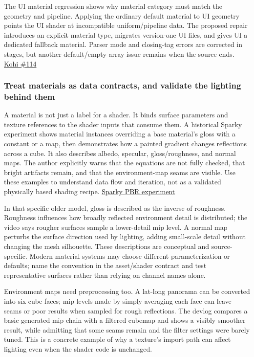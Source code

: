 The UI material regression shows why material category must match the geometry and pipeline. Applying the ordinary default material to UI geometry points the UI shader at incompatible uniform/pipeline data. The proposed repair introduces an explicit material type, migrates version-one UI files, and gives UI a dedicated fallback material. Parser mode and closing-tag errors are corrected in stages, but another default/empty-array issue remains when the source ends. \href{https://www.youtube.com/watch?v=K-EFytY5Pmg}{Kohi \#114}

\subsubsection{Treat materials as data contracts, and validate the lighting behind them}\label{06-engine-ii-ch025-treat-materials-as-data-contracts-and-validate-the-lighting-behind-them}

A material is not just a label for a shader. It binds surface parameters and texture references to the shader inputs that consume them. A historical Sparky experiment shows material instances overriding a base material's gloss with a constant or a map, then demonstrates how a painted gradient changes reflections across a cube. It also describes albedo, specular, gloss/roughness, and normal maps. The author explicitly warns that the equations are not fully checked, that bright artifacts remain, and that the environment-map seams are visible. Use these examples to understand data flow and iteration, not as a validated physically based shading recipe. \href{https://www.youtube.com/watch?v=zqmgcQd6ayc&t=17m30s}{Sparky PBR experiment}

In that specific older model, gloss is described as the inverse of roughness. Roughness influences how broadly reflected environment detail is distributed; the video says rougher surfaces sample a lower-detail mip level. A normal map perturbs the surface direction used by lighting, adding small-scale detail without changing the mesh silhouette. These descriptions are conceptual and source-specific. Modern material systems may choose different parameterization or defaults; name the convention in the asset/shader contract and test representative surfaces rather than relying on channel names alone.

Environment maps need preprocessing too. A lat-long panorama can be converted into six cube faces; mip levels made by simply averaging each face can leave seams or poor results when sampled for rough reflections. The devlog compares a basic generated mip chain with a filtered cubemap and shows a visibly smoother result, while admitting that some seams remain and the filter settings were barely tuned. This is a concrete example of why a texture's import path can affect lighting even when the shader code is unchanged.

